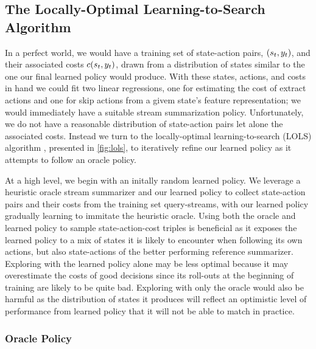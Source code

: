 \subsection{The Locally-Optimal Learning-to-Search Algorithm}
\label{sec:algorithm}

In a perfect world, we would have a training set of state-action 
pairs, $(s_t,y_t)$,
and their associated costs $c(s_t, y_t)$, drawn from a distribution
of states similar to the one our final learned policy would produce.
With these states, actions, and costs in hand we could fit two linear regressions, one for estimating the cost of extract actions and one for skip actions
from a givem state's feature representation;
we would immediately have a suitable stream summarization
policy. Unfortunately, we do not 
have a reasonable distribution of state-action pairs let alone the 
associated costs. Instead we turn to the locally-optimal learning-to-search (LOLS) algorithm \citep{chang2015}, presented in \autoref{fig:lols},
to iteratively refine our learned policy as it attempts to follow an
oracle policy. 

At a high level, we begin with an initally random learned policy.  We leverage
a heuristic oracle stream summarizer and our learned policy to collect
state-action pairs and their costs from the training set query-streams, with
our learned policy gradually learning to immitate the heuristic oracle. Using
both the oracle and learned policy to sample state-action-cost triples is
beneficial as it exposes the learned policy to a mix of states it is likely to
encounter when following its own actions, but also state-actions of the better
performing reference summarizer. Exploring with the learned policy alone may
be less optimal because it may overestimate the costs of good decisions since
its roll-outs at the beginning of training are likely to be quite bad.
Exploring with only the oracle would also be harmful as the distribution of
states it produces will reflect an optimistic level of performance from
learned policy that it will not be able to match in practice.


\subsubsection{Oracle Policy}

